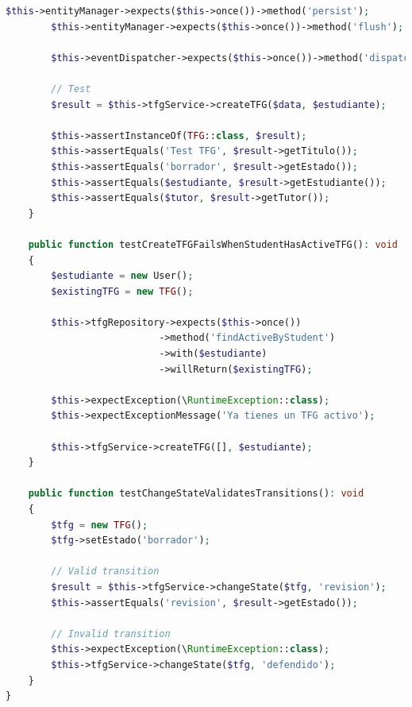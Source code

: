 \documentclass[12pt,a4paper,oneside]{report}
\begin{document}
\begin{lstlisting}[language=PHP]
        $this->entityManager->expects($this->once())->method('persist');
        $this->entityManager->expects($this->once())->method('flush');

        $this->eventDispatcher->expects($this->once())->method('dispatch');

        // Test
        $result = $this->tfgService->createTFG($data, $estudiante);

        $this->assertInstanceOf(TFG::class, $result);
        $this->assertEquals('Test TFG', $result->getTitulo());
        $this->assertEquals('borrador', $result->getEstado());
        $this->assertEquals($estudiante, $result->getEstudiante());
        $this->assertEquals($tutor, $result->getTutor());
    }

    public function testCreateTFGFailsWhenStudentHasActiveTFG(): void
    {
        $estudiante = new User();
        $existingTFG = new TFG();

        $this->tfgRepository->expects($this->once())
                           ->method('findActiveByStudent')
                           ->with($estudiante)
                           ->willReturn($existingTFG);

        $this->expectException(\RuntimeException::class);
        $this->expectExceptionMessage('Ya tienes un TFG activo');

        $this->tfgService->createTFG([], $estudiante);
    }

    public function testChangeStateValidatesTransitions(): void
    {
        $tfg = new TFG();
        $tfg->setEstado('borrador');

        // Valid transition
        $result = $this->tfgService->changeState($tfg, 'revision');
        $this->assertEquals('revision', $result->getEstado());

        // Invalid transition
        $this->expectException(\RuntimeException::class);
        $this->tfgService->changeState($tfg, 'defendido');
    }
}
\end{lstlisting}
\end{document}
